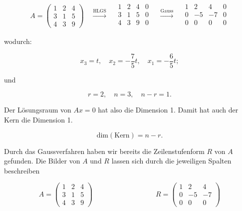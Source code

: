 \begin{equation*}
    A = \begin{pmatrix} 1 & 2 &  4 \\ 3 & 1 & 5 \\ 4 & 3 & 9 \end{pmatrix} \quad \xrightarrow{\text{HLGS}} \quad \begin{array}{ccc|c}
        1 & 2 & 4 & 0 \\
        3 & 1 & 5 & 0 \\
        4 & 3 & 9 & 0 \\
    \end{array} \quad \xrightarrow{\text{Gauss}} \quad \begin{array}{ccc|c}
        1 & 2 & 4 & 0 \\
        0 & -5 & -7 & 0 \\
        0 & 0 & 0 & 0 \\
    \end{array}
\end{equation*}

wodurch:

\begin{equation*}
    x_3 = t, \quad x_2 = -\frac{7}{5} t, \quad x_1 =  - \frac{6}{5}t;
\end{equation*}

und 

\begin{equation*}
    r = 2, \quad n = 3, \quad n - r = 1.
\end{equation*}

Der Lösungsraum von \( Ax=0 \) hat also die Dimension 1. Damit hat auch der Kern die Dimension 1. 

\begin{equation*}
    \text{dim}(\text{Kern}) = n - r.
\end{equation*}

Durch das Gaussverfahren haben wir bereits die Zeilenstufenform \( R \) von \( A \) gefunden. Die Bilder von \( A \) und \( R \) lassen sich durch die jeweiligen Spalten beschreiben

\begin{equation*}
    A = \begin{pmatrix}
        1 & 2 & 4 \\ 3 & 1 & 5 \\ 4 & 3 & 9
    \end{pmatrix} \qquad \qquad \qquad \qquad \quad
    R = \begin{pmatrix}
        1 & 2 & 4 \\ 0 & -5 & -7 \\ 0 & 0 & 0
    \end{pmatrix}
\end{equation*}

